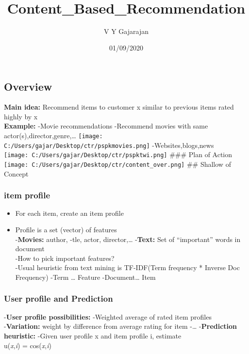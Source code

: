 \documentclass[
]{article}
\title{Content\_Based\_Recommendation}
\author{V Y Gajarajan}
\date{01/09/2020}
\providecommand{\tightlist}{%
  \setlength{\itemsep}{0pt}\setlength{\parskip}{0pt}}
\begin{document}
\maketitle

\hypertarget{overview}{%
\subsection{Overview}\label{overview}}

\textbf{Main idea:} Recommend items to customer x similar to previous
items rated highly by x\\
\textbf{Example:} -Movie recommendations -Recommend movies with same
actor(s),director,genre,\ldots{}
\texttt{[image: C:/Users/gajar/Desktop/ctr/pspkmovies.png]}
-Websites,blogs,news\\
\texttt{[image: C:/Users/gajar/Desktop/ctr/pspktwi.png]} \#\#\# Plan of
Action \texttt{[image: C:/Users/gajar/Desktop/ctr/content\_over.png]}
\#\# Shallow of Concept

\hypertarget{item-profile}{%
\subsubsection{item profile}\label{item-profile}}

\begin{itemize}
\tightlist
\item
  For each item, create an item profile
\item
  Profile is a set (vector) of features\\
  -\textbf{Movies:} author, -tle, actor, director,\ldots{}
  -\textbf{Text:} Set of ``important'' words in document\\
  -How to pick important features?\\
  -Usual heuristic from text mining is TF-IDF(Term frequency * Inverse
  Doc Frequency) -Term \ldots{} Feature -Document\ldots{} Item
\end{itemize}

\hypertarget{user-profile-and-prediction}{%
\subsubsection{User profile and
Prediction}\label{user-profile-and-prediction}}

-\textbf{User profile possibilities:} -Weighted average of rated item
profiles\\
-\textbf{Variation:} weight by difference from average rating for item
-\ldots{} -\textbf{Prediction heuristic:} -Given user profile x and item
profile i, estimate\\
u(\emph{\emph{x}},\emph{\emph{i}}) =
cos(\emph{\emph{x}},\emph{\emph{i}})
\end{document}
